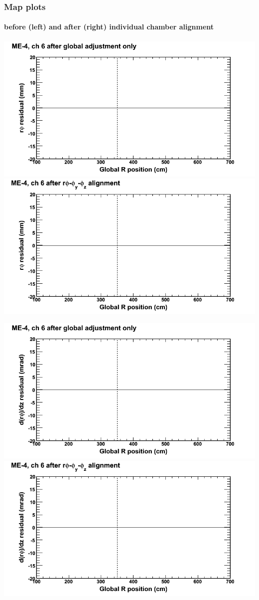 \documentclass[compress]{beamer}
\begin{document}
\begin{frame}
\frametitle{Map plots}
\framesubtitle{before (left) and after (right) individual chamber alignment}
\includegraphics[width=0.5\linewidth]{ringmapplots_3dof/before_CSCvsr_mem4ch06_x.png} \includegraphics[width=0.5\linewidth]{ringmapplots_3dof/after_CSCvsr_mem4ch06_x.png}

\includegraphics[width=0.5\linewidth]{ringmapplots_3dof/before_CSCvsr_mem4ch06_dxdz.png} \includegraphics[width=0.5\linewidth]{ringmapplots_3dof/after_CSCvsr_mem4ch06_dxdz.png}
\end{frame}
\end{document}
